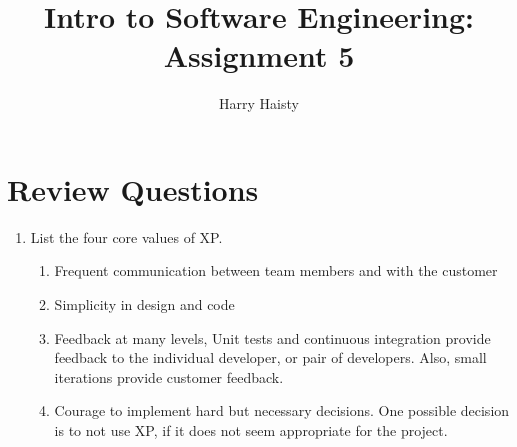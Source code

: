 \documentclass[11pt]{article}
\title{Intro to Software Engineering: Assignment 5}
\author{Harry Haisty}
\begin{document}
\maketitle
\section*{Review Questions}
\begin{enumerate}

    \item List the four core values of XP.
    \begin{enumerate}
        \item Frequent communication between team members and with the customer
        \item Simplicity in design and code
        \item Feedback at many levels, Unit tests and continuous integration provide feedback to the individual developer, or pair of developers. Also, small iterations provide customer feedback. 
        \item Courage to implement hard but necessary decisions. One possible decision is to not use XP, if it does not seem appropriate for the project. 
    \end{enumerate}
    

\end{enumerate}
\end{document}
